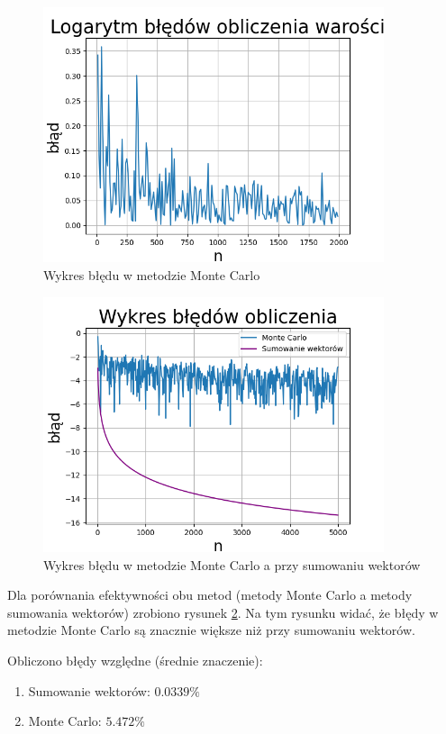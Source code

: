 \documentclass[12pt,a4paper]{article}
\begin{document}
\begin{figure}[!htb]
    \centering
        \centering
        \includegraphics[width=10cm]{images/mc.png}
        \caption{Wykres błędu w metodzie Monte Carlo}
        \label{fig:mc}
\end{figure}

\newpage

\begin{figure}[!htb]
    \centering
        \centering
        \includegraphics[width=10cm]{images/h4.png}
        \caption{Wykres błędu w metodzie Monte Carlo a przy sumowaniu wektorów}
        \label{fig:h4}
\end{figure}

Dla porównania efektywności obu metod (metody Monte Carlo a metody sumowania wektorów) zrobiono rysunek \ref{fig:h4}. Na tym rysunku widać, że błędy w metodzie Monte Carlo są znacznie większe niż przy sumowaniu wektorów. 

Obliczono błędy względne (średnie znaczenie): 
\begin{enumerate}
    \item Sumowanie wektorów: $0.0339\%$
    \item Monte Carlo: $5.472\%$
\end{enumerate}
\end{document}
